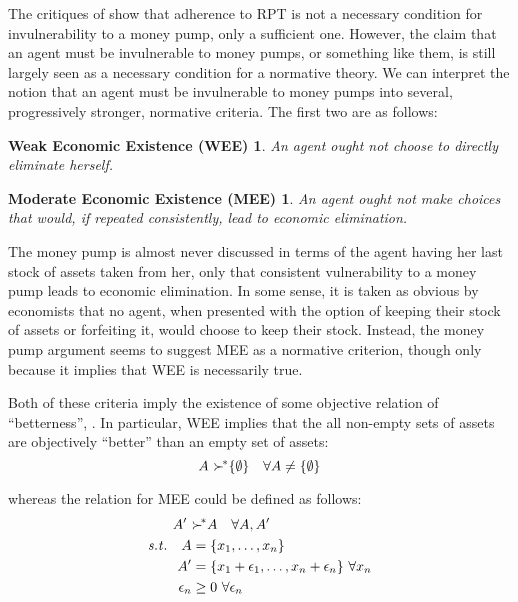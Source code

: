 \addtocounter{footnote}{-1}

The critiques of \textcite{Cubitt2001} show that adherence to RPT is not a necessary condition for invulnerability to a money pump, only a sufficient one.
However, the claim that an agent must be invulnerable to money pumps, or something like them, is still largely seen as a necessary condition for a normative theory.
We can interpret the notion that an agent must be invulnerable to money pumps into several, progressively stronger, normative criteria.
The first two are as follows:

\newtheorem*{WEE}{Weak Economic Existence (WEE)}
\newtheorem*{MEE}{Moderate Economic Existence (MEE)}
\begin{WEE}
	\label{th:WEE}
	An agent ought not choose to directly eliminate herself.
\end{WEE}
\begin{MEE}
	\label{th:MEE}
	An agent ought not make choices that would, if repeated consistently, lead to economic elimination.
\end{MEE}

The money pump is almost never discussed in terms of the agent having her last stock of assets taken from her, only that consistent vulnerability to a money pump leads to economic elimination.
In some sense, it is taken as obvious by economists that no agent, when presented with the option of keeping their stock of assets or forfeiting it, would choose to keep their stock.
Instead, the money pump argument seems to suggest MEE as a normative criterion, though only because it implies that WEE is necessarily true.

Both of these criteria imply the existence of some objective relation of \enquote{betterness}, {\OB}.
In particular, WEE implies that the all non-empty sets of assets are objectively \enquote{better} than an empty set of assets:
\begin{equation}
	\label{eq:WEE}
	A\ {\succ^{\!*}} \{\emptyset\} \quad \forall A \neq \{\emptyset\}
\end{equation}

\noindent whereas the {\OB} relation for MEE could be defined as follows:
\begin{align}
	\label{eq:MEE}
	\begin{split}
		A^\prime\ &{\OB} A \quad\forall A, A^\prime\\
		\mathit{s.t.}\quad A &= \{x_1,\ldots,x_n\}\\
		A^\prime &= \{x_1 + \epsilon_1,\ldots,x_n+\epsilon_n\} \ \forall x_n \\
		\epsilon_n &\geq 0 \ \forall \epsilon_n
	\end{split}
\end{align}

